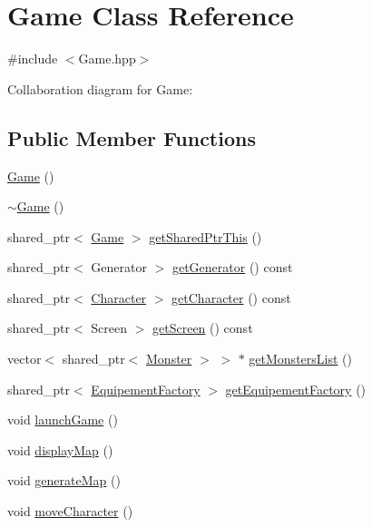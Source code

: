\hypertarget{classGame}{\section{Game Class Reference}
\label{classGame}
}


{\ttfamily \#include $<$Game.\-hpp$>$}



Collaboration diagram for Game\-:
\subsection*{Public Member Functions}
\begin{DoxyCompactItemize}
\item 
\hyperlink{classGame_ad59df6562a58a614fda24622d3715b65}{Game} ()
\item 
\hyperlink{classGame_ae3d112ca6e0e55150d2fdbc704474530}{$\sim$\-Game} ()
\item 
shared\-\_\-ptr$<$ \hyperlink{classGame}{Game} $>$ \hyperlink{classGame_affaa9a4a7cc77fcc1fbd140e60f8907b}{get\-Shared\-Ptr\-This} ()
\item 
shared\-\_\-ptr$<$ Generator $>$ \hyperlink{classGame_a2a05d793c901ebdc60832d187b58d501}{get\-Generator} () const 
\item 
shared\-\_\-ptr$<$ \hyperlink{classCharacter}{Character} $>$ \hyperlink{classGame_acbabdf93244732c23a8fe1b482548fd5}{get\-Character} () const 
\item 
shared\-\_\-ptr$<$ Screen $>$ \hyperlink{classGame_a65eb691cddef147865580a8e0b76c579}{get\-Screen} () const 
\item 
vector$<$ shared\-\_\-ptr$<$ \hyperlink{classMonster}{Monster} $>$ $>$ $\ast$ \hyperlink{classGame_a68cfd228e261c182cfadf90463dc4727}{get\-Monsters\-List} ()
\item 
shared\-\_\-ptr$<$ \hyperlink{classEquipementFactory}{Equipement\-Factory} $>$ \hyperlink{classGame_a9e430bb75a7df9425b257d0018a97bb5}{get\-Equipement\-Factory} ()
\item 
void \hyperlink{classGame_aedb4cdc93c8ab85f2f7aff018ccd76ca}{launch\-Game} ()
\item 
void \hyperlink{classGame_a265b4a907a360afbb131334300968c9d}{display\-Map} ()
\item 
void \hyperlink{classGame_a124812c1a7b84f3aead51cb35a5146f8}{generate\-Map} ()
\item 
void \hyperlink{classGame_a8e92b564d2a037f0455b2f10ec9900f0}{move\-Character} ()
\item 

\end{DoxyCompactItemize}
